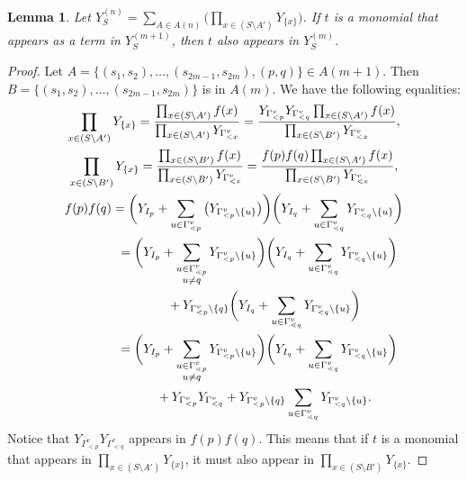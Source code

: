 \documentclass[10pt,a4paper]{amsart}
\numberwithin{equation}{section}
\newtheorem{Lemma}[Theorem]{Lemma}
\begin{document}
\begin{Lemma}\label{lem:Y-term-containment}
Let $Y_S^{(n)}=\sum_{A\in A
(n)}\big(\prod_{x\in (S\setminus A')}Y_{\{x\}}\big)$. If $t$ is a monomial that appears as a term in $Y_S^{(m+1)}$, then $t$ also appears in $Y_S^{(m)}$.
\end{Lemma}
\begin{proof}
Let $A=\{(s_1,s_2),\dots,(s_{2m-1},s_{2m}),(p,q)\}\in A(m+1)$. Then $B=\{(s_1,s_2),\dots,(s_{2m-1},\allowbreak s_{2m})\}$ is in $A(m)$. We have the following equalities:
\begin{gather*}
\prod_{x\in (S\setminus A')}Y_{\{x\}} =\frac{\prod_{x\in (S\setminus A')}f(x)}{\prod_{x\in (S\setminus A')}Y_{\Gamma_{< x}^v}}=\frac{Y_{\Gamma_{< p}^v}Y_{\Gamma_{< q}^v}\prod_{x\in (S\setminus A')}f(x)}{\prod_{x\in (S\setminus B')}Y_{\Gamma_{< x}^v}}, \\
\prod_{x\in (S\setminus B')}Y_{\{x\}} =\frac{\prod_{x\in (S\setminus B')}f(x)}{\prod_{x\in (S\setminus B')}Y_{\Gamma_{< x}^v}}=\frac{f(p)f(q)\prod_{x\in (S\setminus A')}f(x)}{\prod_{x\in (S\setminus B')}Y_{\Gamma_{< x}^v}},\\
f(p)f(q)= \bigg(Y_{I_{p}}+\sum_{u\in\Gamma_{\lessdot p}^v}\big(Y_{\Gamma_{< p}^v\setminus\{u\}}\big)\bigg)\bigg(Y_{I_{q}}+\sum_{u\in\Gamma_{\lessdot q}^v}Y_{\Gamma_{< q}^v\setminus\{u\}}\bigg)\\
\hphantom{f(p)f(q)}{}
= \bigg(Y_{I_{p}}+\sum_{\substack{u\in\Gamma_{\lessdot p}^v\\u\neq q}}Y_{\Gamma_{< p}^v\setminus\{u\}}\bigg)\bigg(Y_{I_{q}}+\sum_{u\in\Gamma_{\lessdot q}^v}Y_{\Gamma_{< q}^v\setminus\{u\}}\bigg) \\
\hphantom{f(p)f(q)=}{}+ Y_{\Gamma_{< p}^v\setminus\{q\}}\bigg(Y_{I_{q}}+\sum_{u\in\Gamma_{\lessdot q}^v}Y_{\Gamma_{< q}^v\setminus\{u\}}\bigg)\\
\hphantom{f(p)f(q)}{} = \bigg(Y_{I_{p}}+\sum_{\substack{u\in\Gamma_{\lessdot p}^v\\u\neq q}}Y_{\Gamma_{< p}^v\setminus\{u\}}\bigg)\bigg(Y_{I_{q}}+\sum_{u\in\Gamma_{\lessdot q}^v}Y_{\Gamma_{< q}^v\setminus\{u\}}\bigg)\\
\hphantom{f(p)f(q)=}{} + Y_{\Gamma_{< p}^v}Y_{\Gamma_{< q}^v}+Y_{\Gamma_{< p}^v\setminus\{q\}}\sum_{u\in\Gamma_{\lessdot q}^v}Y_{\Gamma_{< q}^v\setminus\{u\}}.
\end{gather*}
Notice that $Y_{\Gamma_{< p}^v}Y_{\Gamma_{< q}^v}$ appears in $f(p)f(q)$. This means that if $t$ is a monomial that appears in $\prod_{x\in (S\setminus A')}Y_{\{x\}}$, it must also appear in $\prod_{x\in (S\setminus B')}Y_{\{x\}}$.
\end{proof}
\end{document}
